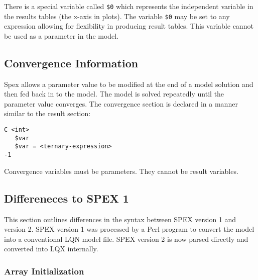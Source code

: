 There is a special variable called \texttt{\$0} which represents the independent variable in the
results tables (the x-axis in plots).  The variable \texttt{\$0} may be set to any expression allowing for
flexibility in producing result tables.  This variable cannot be used as a parameter in the model.

\subsection{Convergence Information}
\label{sec:lqn-convergence-information}

Spex allows a parameter value to be modified at the end of a model solution and
then fed back in to the model.  The model is solved repeatedly until the parameter
value converges.  The convergence section is declared in a manner similar to the
result section:

\lstset{language=LQN,basicstyle=\ttfamily,numbersep=10pt,firstnumber=1}
\begin{lstlisting}[caption={Convergence Information},label=lst:lqn-convergence-info,frame=single]
C <int>
   $var
   $var = <ternary-expression>
-1
\end{lstlisting}

Convergence variables must be parameters.  They cannot be
result variables.

\subsection{Differeneces to SPEX 1}

This section outlines differences in the syntax between SPEX version 1 and version 2.
SPEX version 1 was processed by a Perl program to convert the model into a conventional LQN
model file.  SPEX version 2 is now parsed directly and converted into LQX internally.

\subsubsection{Array Initialization}

